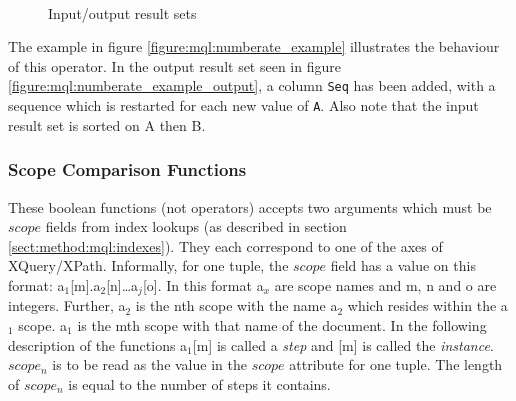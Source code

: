 \begin{figure}[!h]
\centering
\mbox{
\quad
{}
}
\caption{Input/output result sets}
\end{figure}
The example in figure \ref{figure:mql:numberate_example} illustrates the
behaviour of this operator. In the output result set seen in figure
\ref{figure:mql:numberate_example_output}, a column \texttt{Seq} has been
added, with a sequence which is restarted for each new value of \texttt{A}.
Also note that the input result set is sorted on A then B.

\subsubsection{Scope Comparison Functions}

These boolean functions (not operators) accepts two arguments which must be $scope$ fields from index lookups (as
described in section \ref{sect:method:mql:indexes}). They each correspond to one of the axes of XQuery/XPath.
Informally, for one tuple, the $scope$ field has a value on this format:
\textsf{a}$_1$\textsf{[m].}\textsf{a}$_2$\textsf{[n]\ldots}\textsf{a}$_j$\textsf{[o]}. In this format
\textsf{a}$_x$ are scope names and \textsf{m}, \textsf{n} and \textsf{o} are integers. Further, \textsf{a}$_2$ is
the \textsf{n}th scope with the name \textsf{a}$_2$ which resides within the \textsf{a}$_1$ scope. \textsf{a}$_1$
is the \textsf{m}th scope with that name of the document. In the following description of the functions
\textsf{a}$_1$\textsf{[m]} is called a \emph{step} and \textsf{[m]} is called the \emph{instance}. $scope_n$ is to
be read as the value in the $scope$ attribute for one tuple. The length of $scope_n$ is equal to the number of
steps it contains.


